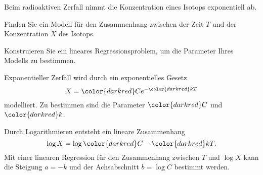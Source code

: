 Beim radioaktiven Zerfall nimmt die Konzentration eines Isotops
exponentiell ab.
\begin{teilaufgaben}
\item
Finden Sie ein Modell für den Zusammenhang zwischen der Zeit $T$
und der Konzentration $X$ des Isotops.
\item
Konstruieren Sie ein lineares Regressionsproblem, um die Parameter
Ihres Modells zu bestimmen.
\end{teilaufgaben}

\begin{loesung}
\begin{teilaufgaben}
\item
Exponentieller Zerfall wird durch ein exponentielles Gesetz
\[
X
=
{\color{darkred}C}e^{-{\color{darkred}k}T}
\]
modelliert.
Zu bestimmen sind die Parameter ${\color{darkred}C}$ und
${\color{darkred}k}$.
\item
Durch Logarithmieren entsteht ein lineare Zusammenhang
\[
\log X
=
\log{\color{darkred}C} - {\color{darkred}k} T.
\]
Mit einer linearen Regression für den Zusammenhang zwischen $T$ und $\log X$
kann die Steigung $a=-k$ und der Achsabschnitt $b=\log C$ bestimmt werden.
\qedhere
\end{teilaufgaben}
\end{loesung}

